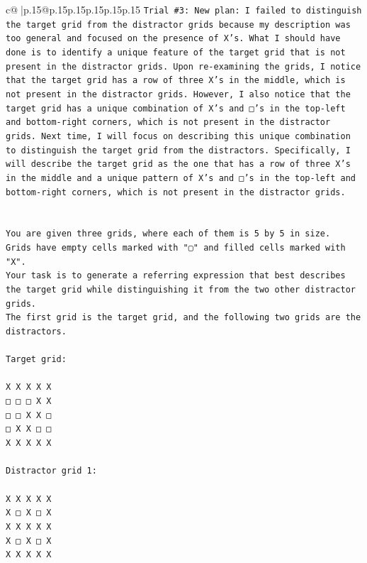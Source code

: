 \documentclass{article}
\begin{document}
{\begin{supertabular}{c@{$\;$}|p{.15\linewidth}@{}p{.15\linewidth}p{.15\linewidth}p{.15\linewidth}p{.15\linewidth}p{.15\linewidth}}
{{{\texttt{Trial \#3: New plan: I failed to distinguish the target grid from the distractor grids because my description was too general and focused on the presence of X's. What I should have done is to identify a unique feature of the target grid that is not present in the distractor grids. Upon re{-}examining the grids, I notice that the target grid has a row of three X's in the middle, which is not present in the distractor grids. However, I also notice that the target grid has a unique combination of X's and □'s in the top{-}left and bottom{-}right corners, which is not present in the distractor grids. Next time, I will focus on describing this unique combination to distinguish the target grid from the distractors. Specifically, I will describe the target grid as the one that has a row of three X's in the middle and a unique pattern of X's and □'s in the top{-}left and bottom{-}right corners, which is not present in the distractor grids.} \\
\\ 
\\ 
\texttt{You are given three grids, where each of them is 5 by 5 in size.} \\
\texttt{Grids have empty cells marked with "▢" and filled cells marked with "X".} \\
\texttt{Your task is to generate a referring expression that best describes the target grid while distinguishing it from the two other distractor grids.} \\
\texttt{The first grid is the target grid, and the following two grids are the distractors.} \\
\\ 
\texttt{Target grid:} \\
\\ 
\texttt{X X X X X} \\
\texttt{□ □ □ X X} \\
\texttt{□ □ X X □} \\
\texttt{□ X X □ □} \\
\texttt{X X X X X} \\
\\ 
\texttt{Distractor grid 1:} \\
\\ 
\texttt{X X X X X} \\
\texttt{X □ X □ X} \\
\texttt{X X X X X} \\
\texttt{X □ X □ X} \\
\texttt{X X X X X} \\
\\ 
}}}
\end{supertabular}}
\end{document}
